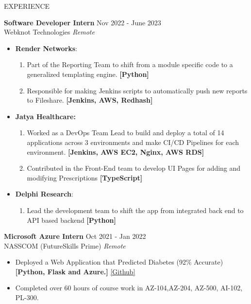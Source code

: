 \documentclass{resume} %
\begin{document}
\begin{rSection}{EXPERIENCE}

\textbf{Software Developer Intern} \hfill Nov 2022 - June 2023\\
Webknot Technologies \hfill \textit{Remote}
 \begin{itemize}
    \itemsep -2pt {} 
     \item \textbf{Render Networks}: 
        \begin{enumerate}
        \itemsep -2pt
            \item Part of the Reporting Team to shift from a module specific code to a generalized templating engine. \textbf{[Python]}
            \item Responsible for making Jenkins scripts to automatically push new reports to Fileshare. \textbf{[Jenkins, AWS, Redhash]}
        \end{enumerate}
        
    \item \textbf{Jatya Healthcare:} 
        \begin{enumerate}
        \itemsep -2pt
            \item Worked as a DevOps Team Lead to build and deploy a total of 14 applications across 3 environments and make CI/CD Pipelines for each environment. \textbf{[Jenkins, AWS EC2, Nginx, AWS RDS]}
            \item Contributed in the Front-End team to develop UI Pages for adding and modifying Prescriptions \textbf{[TypeScript]}
        \end{enumerate}

    \item \textbf{Delphi Research}: 
    \begin{enumerate}
    \itemsep -2pt
            \item Lead the development team to shift the app from integrated back end to API based backend \textbf{[Python]}
        \end{enumerate}
 \end{itemize}

\vspace{2.5pt}
 
\textbf{Microsoft Azure Intern} \hfill Oct 2021 - Jan 2022\\
NASSCOM (FutureSkills Prime) \hfill \textit{Remote}
 \begin{itemize}
    \itemsep -2pt {} 
     \item Deployed a Web Application that Predicted Diabetes (92\% Accurate) \textbf{[Python, Flask and Azure.]} 
     \href {https://github.com/Sabyasachi-Seal/DiabetesPredictor}{[Github]}
     \item Completed over 60 hours of course work in AZ-104,AZ-204, AZ-500, AI-102, PL-300.
 \end{itemize}


\end{rSection} 
\end{document}
